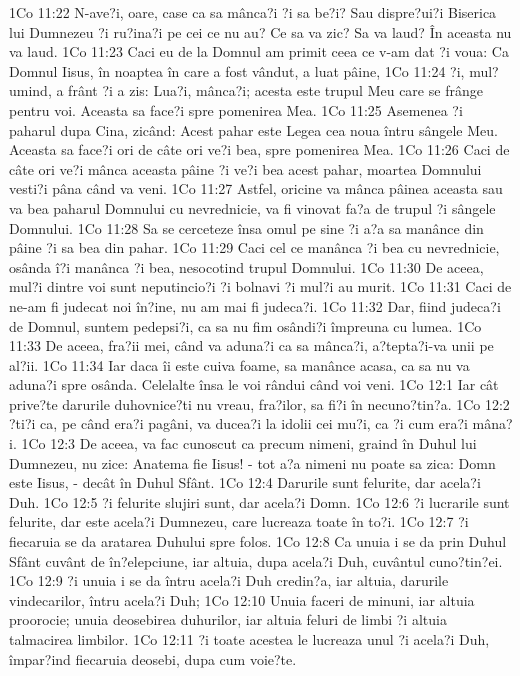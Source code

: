 1Co 11:22  N-ave?i, oare, case ca sa mânca?i ?i sa be?i? Sau dispre?ui?i Biserica lui Dumnezeu ?i ru?ina?i pe cei ce nu au? Ce sa va zic? Sa va laud? În aceasta nu va laud.
1Co 11:23  Caci eu de la Domnul am primit ceea ce v-am dat ?i voua: Ca Domnul Iisus, în noaptea în care a fost vândut, a luat pâine,
1Co 11:24  ?i, mul?umind, a frânt ?i a zis: Lua?i, mânca?i; acesta este trupul Meu care se frânge pentru voi. Aceasta sa face?i spre pomenirea Mea.
1Co 11:25  Asemenea ?i paharul dupa Cina, zicând: Acest pahar este Legea cea noua întru sângele Meu. Aceasta sa face?i ori de câte ori ve?i bea, spre pomenirea Mea.
1Co 11:26  Caci de câte ori ve?i mânca aceasta pâine ?i ve?i bea acest pahar, moartea Domnului vesti?i pâna când va veni.
1Co 11:27  Astfel, oricine va mânca pâinea aceasta sau va bea paharul Domnului cu nevrednicie, va fi vinovat fa?a de trupul ?i sângele Domnului.
1Co 11:28  Sa se cerceteze însa omul pe sine ?i a?a sa manânce din pâine ?i sa bea din pahar.
1Co 11:29  Caci cel ce manânca ?i bea cu nevrednicie, osânda î?i manânca ?i bea, nesocotind trupul Domnului.
1Co 11:30  De aceea, mul?i dintre voi sunt neputincio?i ?i bolnavi ?i mul?i au murit.
1Co 11:31  Caci de ne-am fi judecat noi în?ine, nu am mai fi judeca?i.
1Co 11:32  Dar, fiind judeca?i de Domnul, suntem pedepsi?i, ca sa nu fim osândi?i împreuna cu lumea.
1Co 11:33  De aceea, fra?ii mei, când va aduna?i ca sa mânca?i, a?tepta?i-va unii pe al?ii.
1Co 11:34  Iar daca îi este cuiva foame, sa manânce acasa, ca sa nu va aduna?i spre osânda. Celelalte însa le voi rândui când voi veni.
1Co 12:1  Iar cât prive?te darurile duhovnice?ti nu vreau, fra?ilor, sa fi?i în necuno?tin?a.
1Co 12:2  ?ti?i ca, pe când era?i pagâni, va ducea?i la idolii cei mu?i, ca ?i cum era?i mâna?i.
1Co 12:3  De aceea, va fac cunoscut ca precum nimeni, graind în Duhul lui Dumnezeu, nu zice: Anatema fie Iisus! - tot a?a nimeni nu poate sa zica: Domn este Iisus, - decât în Duhul Sfânt.
1Co 12:4  Darurile sunt felurite, dar acela?i Duh.
1Co 12:5  ?i felurite slujiri sunt, dar acela?i Domn.
1Co 12:6  ?i lucrarile sunt felurite, dar este acela?i Dumnezeu, care lucreaza toate în to?i.
1Co 12:7  ?i fiecaruia se da aratarea Duhului spre folos.
1Co 12:8  Ca unuia i se da prin Duhul Sfânt cuvânt de în?elepciune, iar altuia, dupa acela?i Duh, cuvântul cuno?tin?ei.
1Co 12:9  ?i unuia i se da întru acela?i Duh credin?a, iar altuia, darurile vindecarilor, întru acela?i Duh;
1Co 12:10  Unuia faceri de minuni, iar altuia proorocie; unuia deosebirea duhurilor, iar altuia feluri de limbi ?i altuia talmacirea limbilor.
1Co 12:11  ?i toate acestea le lucreaza unul ?i acela?i Duh, împar?ind fiecaruia deosebi, dupa cum voie?te.
